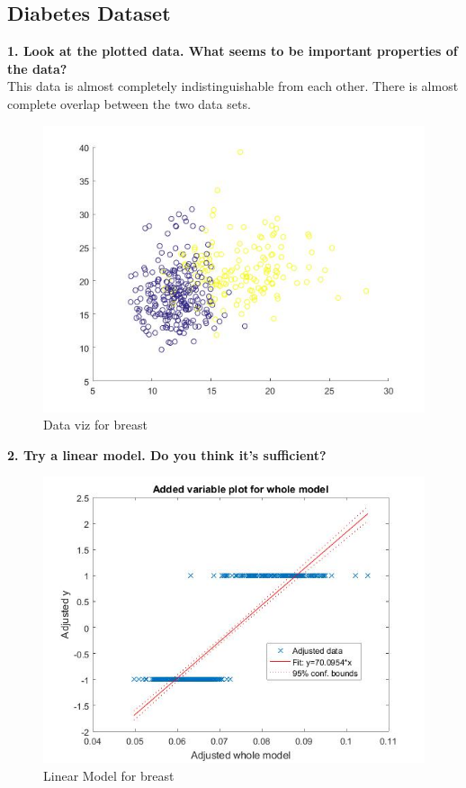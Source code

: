 \documentclass[11pt,oneside,a4paper]{article}
\begin{document}
\subsection{Diabetes Dataset}

\textbf{1. Look at the plotted data. What seems to be important properties of the data?}\\

This data is almost completely indistinguishable from each other. There is almost complete overlap between the two data sets. 
\begin{figure}[H]
	\centering
	\includegraphics[scale=0.4]{../Figures/breast_viz}
	\caption{Data viz for breast }
\end{figure}

\textbf{2. Try a linear model. Do you think it’s sufficient?}\\

\begin{figure}[H]
	\centering
	\includegraphics[scale=0.4]{../Figures/breast_lin}
	\caption{Linear Model for  breast }
\end{figure}
\end{document}
